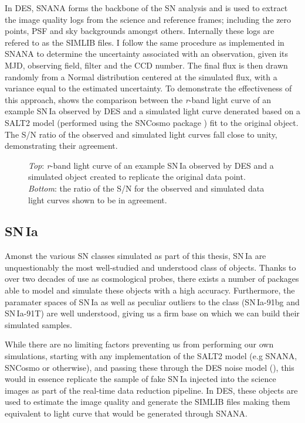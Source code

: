 In DES, SNANA forms the backbone of the SN analysis and is used to extract the image quality logs from the science and reference frames; including the zero points, PSF and sky backgrounds amongst others. Internally these logs are refered to as the \textsc{SIMLIB} files. I follow the same procedure as implemented in SNANA to determine the uncertainty associated with an observation, given its MJD, observing field, filter and the CCD number. The final flux is then drawn randomly from a Normal distribution centered at the simulated flux, with a variance equal to the estimated uncertainty. To demonstrate the effectiveness of this approach,  shows the comparison between the \textit{r}-band light curve of an example SN\,Ia observed by DES and a simulated light curve denerated based on a SALT2 model (performed using the SNCosmo package \citep{Barbary2014}) fit to the original object. The S/N ratio of the observed and simulated light curves fall close to unity, demonstrating their agreement.

\begin{figure}
  \caption{\textit{Top}: \textit{r}-band light curve of an example SN\,Ia observed by DES and a simulated object created to replicate the original data point. \textit{Bottom}: the ratio of the S/N for the observed and simulated data light curves shown to be in agreement.}
  \label{fig:IaNoiseComp}
\end{figure}

\subsection{SN\,Ia}
Amonst the various SN classes simulated as part of this thesis, SN\,Ia are unquestionably the most well-studied and understood class of objects. Thanks to over two decades of use as cosmological probes, there exists a number of packages able to model and simulate these objects with a high accuracy. Furthermore, the paramater spaces of SN\,Ia as well as peculiar outliers to the class (SN\,Ia-91bg and SN\,Ia-91T) are well understood, giving us a firm base on which we can build their simulated samples.

While there are no limiting factors preventing us from performing our own simulations, starting with any implementation of the SALT2 model (e.g SNANA, SNCosmo or otherwise), and passing these through the DES noise model (), this would in essence replicate the sample of fake SN\,Ia injected into the science images as part of the real-time data reduction pipeline. In DES, these objects are used to estimate the image quality and generate the \textsc{SIMLIB} files making them equivalent to light curve that would be generated through SNANA.

